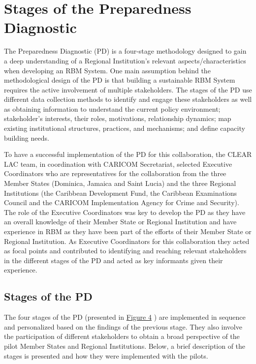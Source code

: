 \documentclass[
  10pt,
]{book}
\begin{document}
\hypertarget{stages-of-the-preparedness-diagnostic}{%
\section{Stages of the Preparedness Diagnostic}\label{stages-of-the-preparedness-diagnostic}}

The Preparedness Diagnostic (PD) is a four-stage methodology designed to gain a deep understanding of a Regional Institution's relevant aspects/characteristics when developing an RBM System. One main assumption behind the methodological design of the PD is that building a sustainable RBM System requires the active involvement of multiple stakeholders. The stages of the PD use different data collection methods to identify and engage these stakeholders as well as obtaining information to understand the current policy environment; stakeholder's interests, their roles, motivations, relationship dynamics; map existing institutional structures, practices, and mechanisms; and define capacity building needs.

To have a successful implementation of the PD for this collaboration, the CLEAR LAC team, in coordination with CARICOM Secretariat, selected Executive Coordinators who are representatives for the collaboration from the three Member States (Dominica, Jamaica and Saint Lucia) and the three Regional Institutions (the Caribbean Development Fund, the Caribbean Examinations Council and the CARICOM Implementation Agency for Crime and Security). The role of the Executive Coordinators was key to develop the PD as they have an overall knowledge of their Member State or Regional Institution and have experience in RBM as they have been part of the efforts of their Member State or Regional Institution. As Executive Coordinators for this collaboration they acted as focal points and contributed to identifying and reaching relevant stakeholders in the different stages of the PD and acted as key informants given their experience.

\hypertarget{stages-of-the-pd}{%
\subsection*{Stages of the PD}\label{stages-of-the-pd}}

The four stages of the PD (presented in \protect\hyperlink{fig:figure4}{Figure 4} ) are implemented in sequence and personalized based on the findings of the previous stage. They also involve the participation of different stakeholders to obtain a broad perspective of the pilot Member States and Regional Institutions. Below, a brief description of the stages is presented and how they were implemented with the pilots.
\end{document}
